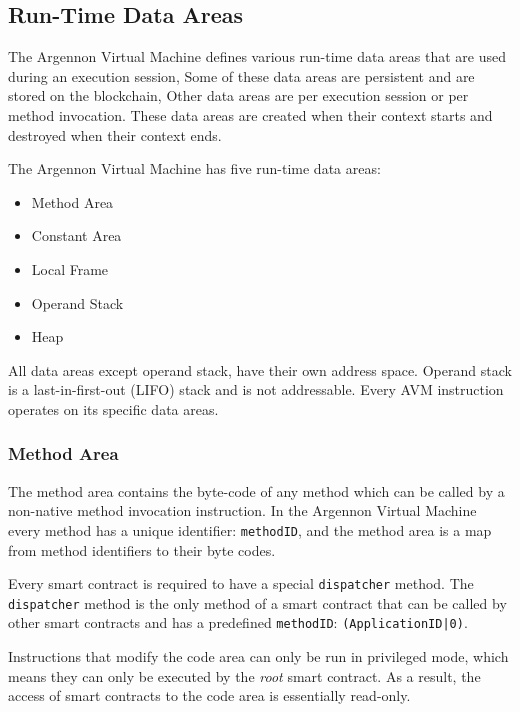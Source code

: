 \subsection{Run-Time Data Areas}\label{subsec:data-areas}

The Argennon Virtual Machine defines various run-time data areas that are used during an execution session,
Some of these data areas are persistent and are stored on the blockchain, Other data areas
are per execution session or per method invocation. These data areas are created when their context starts and
destroyed when their context ends.

The Argennon Virtual Machine has five run-time data areas:
\begin{itemize}
    \item Method Area
    \item Constant Area
    \item Local Frame
    \item Operand Stack
    \item Heap
\end{itemize}
All data areas except operand stack, have their own address space. Operand stack is a
last-in-first-out (LIFO) stack and is not addressable. Every AVM instruction operates on its specific
data areas.

\subsubsection{Method Area}

The method area contains the byte-code of any method which can be called by a non-native method invocation
instruction. In the Argennon Virtual Machine every method has a unique identifier:
\texttt{methodID}, and the method area is a map from method identifiers to their byte codes.

Every smart contract is required to have a special \texttt{dispatcher} method. The \texttt{dispatcher} method is the
only method of a smart contract that can be called by other smart contracts and has a
predefined \texttt{methodID}: \texttt{(ApplicationID|0)}.


Instructions that modify the code area can only be run in privileged mode, which means they can only be executed
by the \emph{root} smart contract. As a result, the access of smart contracts to the code area is essentially
read-only.

